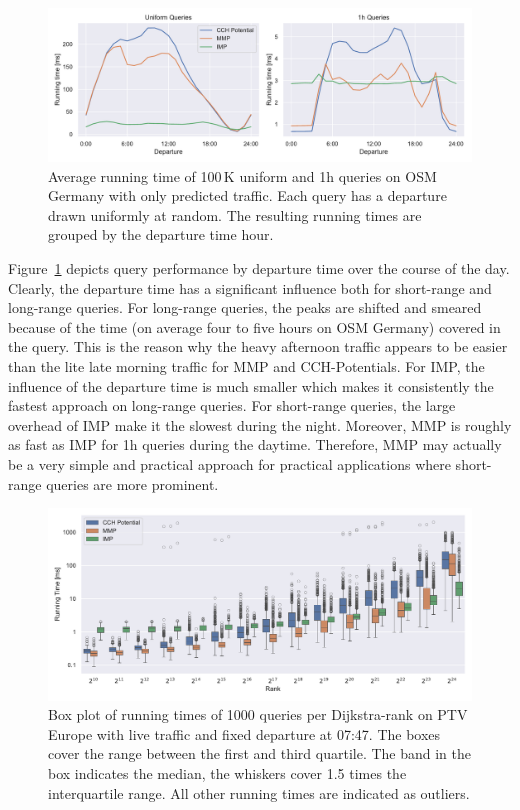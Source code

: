 \documentclass[a4paper,UKenglish,cleveref, autoref, thm-restate,anonymous]{lipics-v2021}
\begin{document}
\begin{figure}[tbh]
\centering
\includegraphics[width=\linewidth]{fig/perf_over_day.pdf}
\caption{
Average running time of 100\,K uniform and 1h queries on OSM Germany with only predicted traffic.
Each query has a departure drawn uniformly at random.
The resulting running times are grouped by the departure time hour.
}\label{fig:by_dep}
\end{figure}

Figure~\ref{fig:by_dep} depicts query performance by departure time over the course of the day.
Clearly, the departure time has a significant influence both for short-range and long-range queries.
For long-range queries, the peaks are shifted and smeared because of the time (on average four to five hours on OSM Germany) covered in the query.
This is the reason why the heavy afternoon traffic appears to be easier than the lite late morning traffic for MMP and CCH-Potentials.
For IMP, the influence of the departure time is much smaller which makes it consistently the fastest approach on long-range queries.
For short-range queries, the large overhead of IMP make it the slowest during the night.
Moreover, MMP is roughly as fast as IMP for 1h queries during the daytime.
Therefore, MMP may actually be a very simple and practical approach for practical applications where short-range queries are more prominent.

\begin{figure}[!b]
\centering
\includegraphics[width=\linewidth]{fig/ranks.pdf}
\caption{
Box plot of running times of 1000 queries per Dijkstra-rank on PTV Europe with live traffic and fixed departure at 07:47.
The boxes cover the range between the first and third quartile.
The band in the box indicates the median, the whiskers cover 1.5 times the interquartile range.
All other running times are indicated as outliers.
}\label{fig:ranks}
\end{figure}
\end{document}
